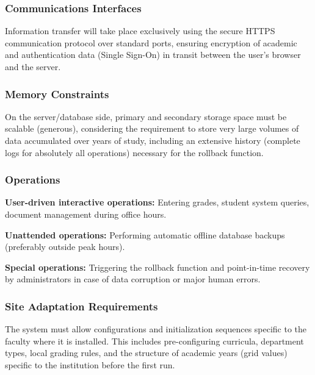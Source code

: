 \documentclass[11pt, a4paper]{article}
\begin{document}
\subsubsection{Communications Interfaces}
Information transfer will take place exclusively using the secure HTTPS communication protocol over standard ports, ensuring encryption of academic and authentication data (Single Sign-On) in transit between the user's browser and the server.

\subsubsection{Memory Constraints}
On the server/database side, primary and secondary storage space must be scalable (generous), considering the requirement to store very large volumes of data accumulated over years of study, including an extensive history (complete logs for absolutely all operations) necessary for the rollback function.

\subsubsection{Operations}
\textbf{User-driven interactive operations:}
Entering grades, student system queries, document management during office hours.

\textbf{Unattended operations:}
Performing automatic offline database backups (preferably outside peak hours).

\textbf{Special operations:}
Triggering the rollback function and point-in-time recovery by administrators in case of data corruption or major human errors.

\subsubsection{Site Adaptation Requirements}
The system must allow configurations and initialization sequences specific to the faculty where it is installed. This includes pre-configuring curricula, department types, local grading rules, and the structure of academic years (grid values) specific to the institution before the first run.
\end{document}
